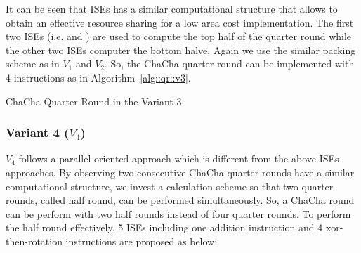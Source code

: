 It can be seen that ISEs has a similar computational structure that allows to obtain an effective resource sharing for a low area cost implementation.
The first two ISEs (i.e.  and ) are used to compute the top half of the quarter round while the other two ISEs computer the bottom halve.
Again we use the similar packing scheme as in $V_1$ and $V_2$. So, the ChaCha quarter round can be implemented with 4 instructions as in Algorithm~\ref{alg::qr::v3}.

\begin{algorithm}
\BlankLine
{}
\caption{ChaCha Quarter Round in the Variant 3.}
\label{alg::qr::v3}
\end{algorithm}


\subsubsection{Variant 4 ($V_4$)}
$V_4$ follows a parallel oriented approach which is different from the above ISEs approaches. By observing two consecutive ChaCha quarter rounds have a similar computational structure, we invest a calculation scheme so that two quarter rounds, called half round, can be performed simultaneously. So, a ChaCha round can be perform with two half rounds instead of four quarter rounds. To perform the half round effectively, 5 ISEs including one addition instruction and 4 xor-then-rotation instructions are proposed as below:     

